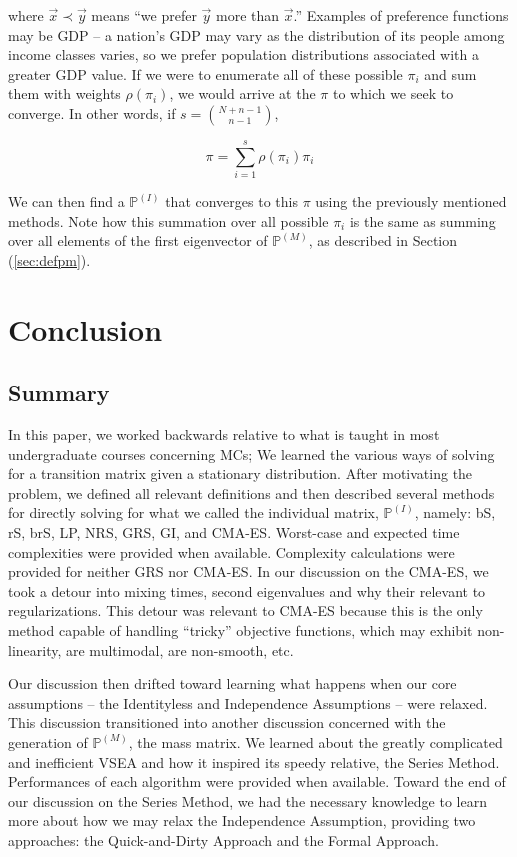 \documentclass{article}
\begin{document}
where $\vec{x} \prec \vec{y}$ means ``we prefer $\vec{y}$ more than $\vec{x}$.'' Examples of preference functions may be GDP -- a nation's GDP may vary as the distribution of its people among income classes varies, so we prefer population distributions associated with a greater GDP value. If we were to enumerate all of these possible $\pi_i$ and sum them with weights $\rho(\pi_i)$, we would arrive at the $\pi$ to which we seek to converge. In other words, if $s = {N+n-1 \choose n-1}$,

\[
\pi = \sum^s_{i=1} \rho(\pi_i)\pi_i
\]

We can then find a $\mathbb{P}^{(I)}$ that converges to this $\pi$ using the previously mentioned methods. Note how this summation over all possible $\pi_i$ is the same as summing over all elements of the first eigenvector of $\mathbb{P}^{(M)}$, as described in Section (\ref{sec:defpm}).

\section{Conclusion}
\subsection{Summary}
In this paper, we worked backwards relative to what is taught in most undergraduate courses concerning MCs; We learned the various ways of solving for a transition matrix given a stationary distribution. After motivating the problem, we defined all relevant definitions and then described several methods for directly solving for what we called the individual matrix, $\mathbb{P}^{(I)}$, namely: bS, rS, brS, LP, NRS, GRS, GI, and CMA-ES. Worst-case and expected time complexities were provided when available. Complexity calculations were provided for neither GRS nor CMA-ES. In our discussion on the CMA-ES, we took a detour into mixing times, second eigenvalues and why their relevant to regularizations. This detour was relevant to CMA-ES because this is the only method capable of handling ``tricky'' objective functions, which may exhibit non-linearity, are multimodal, are non-smooth, etc.

Our discussion then drifted toward learning what happens when our core assumptions -- the Identityless and Independence Assumptions -- were relaxed. This discussion transitioned into another discussion concerned with the generation of $\mathbb{P}^{(M)}$, the mass matrix. We learned about the greatly complicated and inefficient VSEA and how it inspired its speedy relative, the Series Method. Performances of each algorithm were provided when available. Toward the end of our discussion on the Series Method, we had the necessary knowledge to learn more about how we may relax the Independence Assumption, providing two approaches: the Quick-and-Dirty Approach and the Formal Approach.
\end{document}
